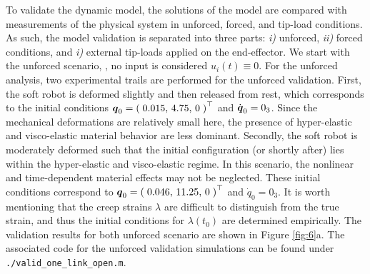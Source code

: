 \begin{example}
\noindent To validate the dynamic model, the solutions of the model are compared with measurements of the physical system in unforced,  forced, and tip-load conditions. As such, the model validation is separated into three parts: \textit{i)} unforced, \textit{ii)} forced conditions, and \textit{i)} external tip-loads applied on the end-effector. We start with the unforced scenario, \ie, no input is considered $u_i(t) \equiv 0$. For the unforced analysis, two experimental trails are performed for the unforced validation. First, the soft robot is deformed slightly and then released from rest, which corresponds to the initial conditions ${\boldsymbol{q}}_0 = \left(\;0.015,\,4.75,\,0\; \right)^\top$ and ${\dot{\boldsymbol{q}}}_0 = 0_3$. Since the mechanical deformations are relatively small here, the presence of hyper-elastic and visco-elastic material behavior are less dominant. Secondly, the soft robot is moderately deformed such that the initial configuration (or shortly after) lies within the hyper-elastic and visco-elastic regime. In this scenario, the nonlinear and time-dependent material effects may not be neglected. These initial conditions correspond to ${\boldsymbol{q}}_0 = \left(\;0.046,\,11.25,\,0\; \right)^\top$ and $\dot{{q}}_0 = 0_3$. It is worth mentioning that the creep strains $\lambda$ are difficult to distinguish from the true strain, and thus the initial conditions for $\lambda(t_0)$ are determined empirically. The validation results for both unforced scenario are shown in Figure \ref{fig:6}a. The associated code for the unforced validation simulations can be found under \texttt{./valid\_one\_link\_open.m}.
\end{example}

